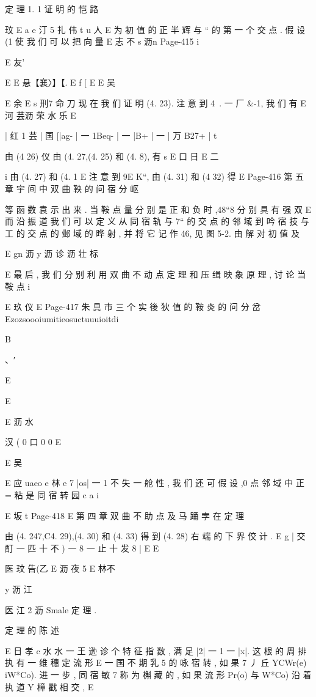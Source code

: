 {{{{{{{{{定 理 1. 1 证 明 的 恺 路

玟
E a e 汀 5 扎
伟 t
u 人
E
为 初 值 的 正 半 辉 与 “ 的 第 一 个 交 点 . 假 设 (1 使 我 们 可 以 把 向 量
E 志 不 s 沥n
Page-415
i

E 友'}
E
E 悬【襄〉】【.
E f
[
E
E 吴

E 余
E
s 刑7 命 刀
现 在 我 们 证 明 (4. 23). 注 意 到 4~. 一 厂 &-1, 我 们 有
E 河 芸沥 荣 水 乐
E

| 红 1 芸 | 国 [|ag- | 一 1Beq- | 一 |B+ | 一 | 万 B27+ |
t

由 (4 26)
仪
由 (4. 27,(4. 25) 和 (4. 8), 有
s
E 口 日
E 二

i
由 (4. 27) 和 (4. 1
E
注 意 到 9E K“, 由 (4. 31) 和 (4 32) 得
E
Page-416
第 五 章 宇 间 中 双 曲 鞅 的 问 宿 分 岖

等 函 数 袁 示 出 来 . 当 鞍 点 量 分 别 是 正 和 负 时 ,48“8 分 别 具 有 强 双
E
而 沿 振 道 我 们 可 以 定 义 从 同 宿 轨 与 7“ 的 交 点 的 邻 域 到 吟 宿 技 与
工 的 交 点 的 邺 域 的 晔 射 , 并 将 它 记 作 46, 见 图 5-2. 由 解 对 初 值 及

E gn 沥 y 沥
诊 沥 壮 标

E
最 后 , 我 们 分 别 利 用 双 曲 不 动 点 定 理 和 压 缉 映 象 原 理 , 讨 论 当 鞍 点
i

E 玖 仪
E
Page-417
朱 具 市 三 个 实 後 狄 值 的 鞍 炎 的 问 分 岔
Ezozsoooiumitieosuctuuuioitdi

B

、′

E

E

E 沥 水
{汉 ( 0 口 0 0
E

E 吴

E 应
uaeo e 林 e 7
|os| 一 1 不 失 一 舱 性 , 我 们 还 可 假 设 ,0 点 邻 域 中 正 = 粘 是 同 宿 转
园 c a i

E 坂 t
Page-418
E 第 四 章 双 曲 不 助 点 及 马 踊 孛 在 定 理

由 (4. 247,C4. 29),(4. 30) 和 (4. 33) 得 到 (4. 28) 右 端 的 下 界 佼 计 .
E
g | 交 酊 一 匹 十 不 ) 一 8 一 止 十 发 8 |
E
E

医 玟 告(乙 E 沥 夜 5
E 林不

y 沥 江

医 江 2 沥
Smale 定 理 .

定 理 的 陈 述

E 日 孝 c 水 水 一 王 逊 诊
个 特 征 指 数 , 满 足 |2| 一 1 一 |x|. 这 根 的 周 排 执 有 一 维 穗 定 流 形
E 一 国 不
期 乳 5 的 咏 宿 转 , 如 果 7 丿 丘 YCWr(e) iW*Co). 进 一 步 , 同 宿
敏 7 称 为 槲 藏 的 , 如 果 流 形 Pr(o) 与 W*Co) 沿 着 执 道 Y 樟 戳 相 交 ,
E

}}}}}}}}}
